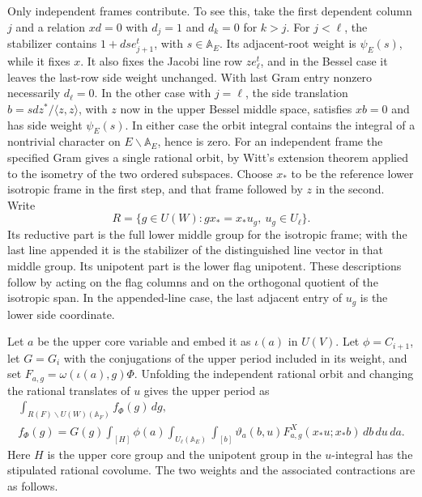 Only independent frames contribute. To see this, take the first
dependent column \(j\) and a relation \(x d=0\) with
\(d_j=1\) and \(d_k=0\) for \(k>j\). For
\(j<\ell\), the stabilizer contains
\(1+d s e_{j+1}^t\), with \(s\in\mathbb A_E\). Its
adjacent-root weight is \(\psi_E(s)\), while it fixes \(x\).
It also fixes the Jacobi line row \(z e_\ell^t\), and in the
Bessel case it leaves the last-row side weight unchanged. With last
Gram entry nonzero necessarily \(d_\ell=0\). In the other case
with \(j=\ell\), the side translation
\(b=s d z^*/\langle z,z\rangle\), with \(z\) now in the
upper Bessel middle space, satisfies \(xb=0\) and has side
weight \(\psi_E(s)\). In either case the orbit integral
contains the integral of a nontrivial character on
\(E\backslash\mathbb A_E\), hence is zero. For an independent
frame the specified Gram gives a single rational orbit, by Witt's
extension theorem applied to the isometry of the two ordered
subspaces. Choose \(x_*\) to be the reference lower isotropic
frame in the first step, and that frame followed by \(z\) in
the second. Write
\[
 R=\{g\in U(W):g x_*=x_* u_g,\ u_g\in U_\ell\}.
\]
Its reductive part is the full lower middle group for the
isotropic frame; with the last line appended it is the stabilizer
of the distinguished line vector in that middle group. Its
unipotent part is the lower flag unipotent. These descriptions
follow by acting on the flag columns and on the orthogonal
quotient of the isotropic span. In the appended-line case, the
last adjacent entry of \(u_g\) is the lower side coordinate.

Let \(a\) be the upper core variable and embed it as
\(\iota(a)\) in \(U(V)\). Let \(\phi=C_{i+1}\), let
\(G=G_i\) with the conjugations of the upper period included in
its weight, and set \(F_{a,g}=\omega(\iota(a),g)\Phi\).
Unfolding the independent rational orbit and changing the
rational translates of \(u\) gives the upper period as
\[
 \begin{gathered}
 \int_{R(F)\backslash U(W)(\mathbb A_F)} f_\Phi(g)\,dg,\\
 f_\Phi(g)=G(g)\int_{[H]}\!\phi(a)
 \int_{U_\ell(\mathbb A_E)}\!\int_{[b]}
    \vartheta_a(b,u) F_{a,g}^X(x_*u;x_*b)\,db\,du\,da .
 \end{gathered}
 \tag{A}
\]
Here \(H\) is the upper core group and the unipotent group
in the \(u\)-integral has the stipulated rational covolume.
The two weights and the associated contractions are as follows.

